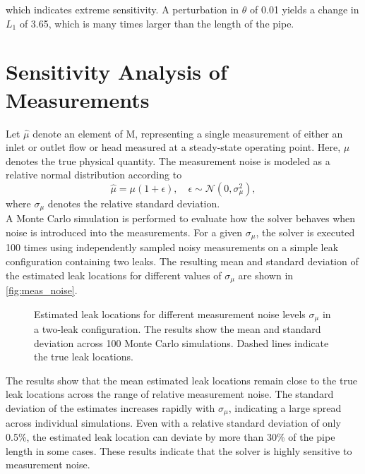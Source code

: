 which indicates extreme sensitivity. A perturbation in $\theta$ of 0.01 yields a change in $L_1$ of 3.65, which is many times larger than the length of the pipe.

\newpage
\section{Sensitivity Analysis of Measurements}
\label{sec:meas_err}

Let $\hat{\mu}$ denote an element of \gls{M}, representing a single measurement of either an inlet or outlet flow or head measured at a steady-state operating point. Here, $\mu$ denotes the true physical quantity. The measurement noise is modeled as a relative normal distribution according to
\begin{equation*}
\hat{\mu} = \mu(1+\epsilon), \quad \epsilon \sim \mathcal{N}(0,\sigma_\mu^2),
\end{equation*}
where $\sigma_\mu$ denotes the relative standard deviation.\\

A Monte Carlo simulation is performed to evaluate how the solver behaves when noise is introduced into the measurements. For a given $\sigma_\mu$, the solver is executed 100 times using independently sampled noisy measurements on a simple leak configuration containing two leaks. The resulting mean and standard deviation of the estimated leak locations for different values of $\sigma_\mu$ are shown in \autoref{fig:meas_noise}.\\

\begin{figure}[ht]
    \centering
    
    \caption[Estimated leak locations for different measurement noise levels]{Estimated leak locations for different measurement noise levels $\sigma_\mu$ in a two-leak configuration. The results show the mean and standard deviation across 100 Monte Carlo simulations. Dashed lines indicate the true leak locations.}
    \label{fig:meas_noise}
\end{figure}

The results show that the mean estimated leak locations remain close to the true leak locations across the range of relative measurement noise. The standard deviation of the estimates increases rapidly with $\sigma_\mu$, indicating a large spread across individual simulations. Even with a relative standard deviation of only 0.5\%, the estimated leak location can deviate by more than 30\% of the pipe length in some cases. These results indicate that the solver is highly sensitive to measurement noise.

